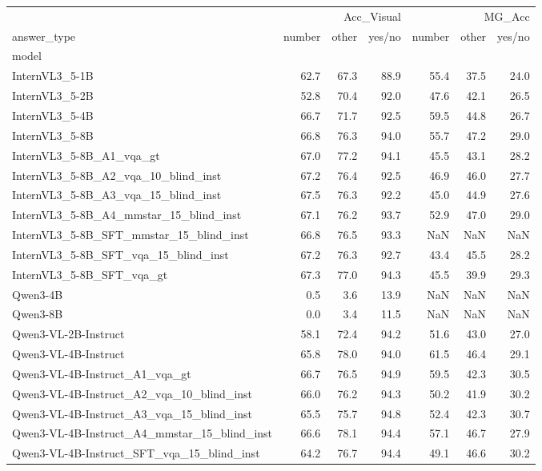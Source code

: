 \begin{tabular}{lrrrrrr}
\toprule
 & \multicolumn{3}{r}{Acc_Visual} & \multicolumn{3}{r}{MG_Acc} \\
answer_type & number & other & yes/no & number & other & yes/no \\
model &  &  &  &  &  &  \\
\midrule
InternVL3_5-1B & 62.7 & 67.3 & 88.9 & 55.4 & 37.5 & 24.0 \\
InternVL3_5-2B & 52.8 & 70.4 & 92.0 & 47.6 & 42.1 & 26.5 \\
InternVL3_5-4B & 66.7 & 71.7 & 92.5 & 59.5 & 44.8 & 26.7 \\
InternVL3_5-8B & 66.8 & 76.3 & 94.0 & 55.7 & 47.2 & 29.0 \\
InternVL3_5-8B_A1_vqa_gt & 67.0 & 77.2 & 94.1 & 45.5 & 43.1 & 28.2 \\
InternVL3_5-8B_A2_vqa_10_blind_inst & 67.2 & 76.4 & 92.5 & 46.9 & 46.0 & 27.7 \\
InternVL3_5-8B_A3_vqa_15_blind_inst & 67.5 & 76.3 & 92.2 & 45.0 & 44.9 & 27.6 \\
InternVL3_5-8B_A4_mmstar_15_blind_inst & 67.1 & 76.2 & 93.7 & 52.9 & 47.0 & 29.0 \\
InternVL3_5-8B_SFT_mmstar_15_blind_inst & 66.8 & 76.5 & 93.3 & NaN & NaN & NaN \\
InternVL3_5-8B_SFT_vqa_15_blind_inst & 67.2 & 76.3 & 92.7 & 43.4 & 45.5 & 28.2 \\
InternVL3_5-8B_SFT_vqa_gt & 67.3 & 77.0 & 94.3 & 45.5 & 39.9 & 29.3 \\
Qwen3-4B & 0.5 & 3.6 & 13.9 & NaN & NaN & NaN \\
Qwen3-8B & 0.0 & 3.4 & 11.5 & NaN & NaN & NaN \\
Qwen3-VL-2B-Instruct & 58.1 & 72.4 & 94.2 & 51.6 & 43.0 & 27.0 \\
Qwen3-VL-4B-Instruct & 65.8 & 78.0 & 94.0 & 61.5 & 46.4 & 29.1 \\
Qwen3-VL-4B-Instruct_A1_vqa_gt & 66.7 & 76.5 & 94.9 & 59.5 & 42.3 & 30.5 \\
Qwen3-VL-4B-Instruct_A2_vqa_10_blind_inst & 66.0 & 76.2 & 94.3 & 50.2 & 41.9 & 30.2 \\
Qwen3-VL-4B-Instruct_A3_vqa_15_blind_inst & 65.5 & 75.7 & 94.8 & 52.4 & 42.3 & 30.7 \\
Qwen3-VL-4B-Instruct_A4_mmstar_15_blind_inst & 66.6 & 78.1 & 94.4 & 57.1 & 46.7 & 27.9 \\
Qwen3-VL-4B-Instruct_SFT_vqa_15_blind_inst & 64.2 & 76.7 & 94.4 & 49.1 & 46.6 & 30.2 \\

\end{tabular}
